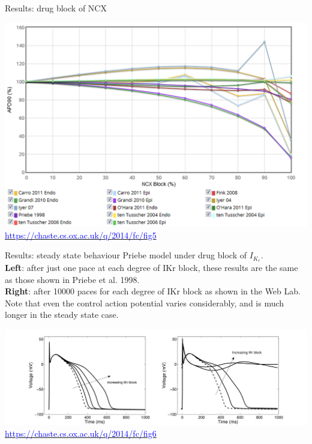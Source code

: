 \documentclass[t,xcolor={usenames,dvipsnames}]{beamer}
\newcommand{\myhref}[2]{\href{#1}{\textcolor{Blue}{#2}}}
\newcommand{\myurl}[1]{\myhref{#1}{#1}}
\begin{document}
\begin{frame}{Results: drug block of NCX}
\begin{center}
\vspace{-.5cm}
\includegraphics[width=\textwidth]{weblab_fig5}\\
\tiny\myurl{https://chaste.cs.ox.ac.uk/q/2014/fc/fig5}
\end{center}
\end{frame}


\begin{frame}{Results: steady state behaviour}
Priebe model under drug block of $I_{K_r}$.\\
\textbf{Left}: after just one pace at each degree of IKr block, these results are the same as those shown in Priebe et al. 1998.\\
\textbf{Right}: after 10000 paces for each degree of IKr block as shown in the Web Lab. Note that even the control action potential varies considerably, and is much longer in the steady state case.
\begin{center}
\includegraphics[width=\textwidth]{weblab_fig6}\\
\tiny\myurl{https://chaste.cs.ox.ac.uk/q/2014/fc/fig6}
\end{center}
\end{frame}
\end{document}
